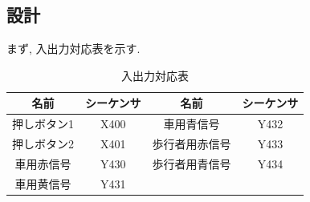 \documentclass[titlepage]{jsarticle}
\begin{document}
  \subsection{設計}
    まず, 入出力対応表を示す.
    \begin{table}[h]
      \caption{入出力対応表}
      \centering
      \begin{tabular}{c|c||c|c}
        \hline
        名前 &       シーケンサ & 名前 &         シーケンサ \\ \hline \hline
        押しボタン1 & X400 &     車用青信号 &    Y432 \\
        押しボタン2 & X401 &     歩行者用赤信号 & Y433 \\
        車用赤信号 &  Y430 &     歩行者用青信号 & Y434 \\
        車用黄信号 &  Y431 & & \\ \hline
      \end{tabular}
    \end{table}
\end{document}
